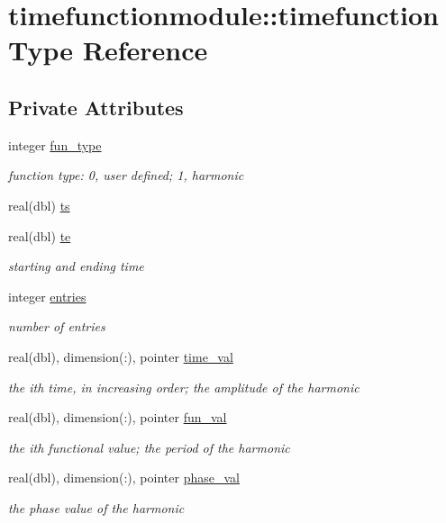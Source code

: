 \hypertarget{structtimefunctionmodule_1_1timefunction}{}\section{timefunctionmodule\+:\+:timefunction Type Reference}
\label{structtimefunctionmodule_1_1timefunction}
\subsection*{Private Attributes}
\begin{DoxyCompactItemize}
\item 
integer \hyperlink{structtimefunctionmodule_1_1timefunction_acd580915b25f29aa47c58467c394d2f4}{fun\+\_\+type}
\begin{DoxyCompactList}\small\item\em function type\+: 0, user defined; 1, harmonic \end{DoxyCompactList}\item 
real(dbl) \hyperlink{structtimefunctionmodule_1_1timefunction_a62e761e489833d17dcd1dbcac5c1dfd6}{ts}
\item 
real(dbl) \hyperlink{structtimefunctionmodule_1_1timefunction_a4378638965011462c9fd4a912f6dc8fd}{te}
\begin{DoxyCompactList}\small\item\em starting and ending time \end{DoxyCompactList}\item 
integer \hyperlink{structtimefunctionmodule_1_1timefunction_a0f07f62ccbe6c9bcc7d9418b4157b234}{entries}
\begin{DoxyCompactList}\small\item\em number of entries \end{DoxyCompactList}\item 
real(dbl), dimension(\+:), pointer \hyperlink{structtimefunctionmodule_1_1timefunction_abad80cdb684de5f31a51015b9d88751f}{time\+\_\+val}
\begin{DoxyCompactList}\small\item\em the ith time, in increasing order; the amplitude of the harmonic \end{DoxyCompactList}\item 
real(dbl), dimension(\+:), pointer \hyperlink{structtimefunctionmodule_1_1timefunction_a7d1b3a0f76df56f38891ba45d161ca9d}{fun\+\_\+val}
\begin{DoxyCompactList}\small\item\em the ith functional value; the period of the harmonic \end{DoxyCompactList}\item 
real(dbl), dimension(\+:), pointer \hyperlink{structtimefunctionmodule_1_1timefunction_a0f4fd140ac6990ddc82b4129b23cfa08}{phase\+\_\+val}
\begin{DoxyCompactList}\small\item\em the phase value of the harmonic \end{DoxyCompactList}\end{DoxyCompactItemize}


